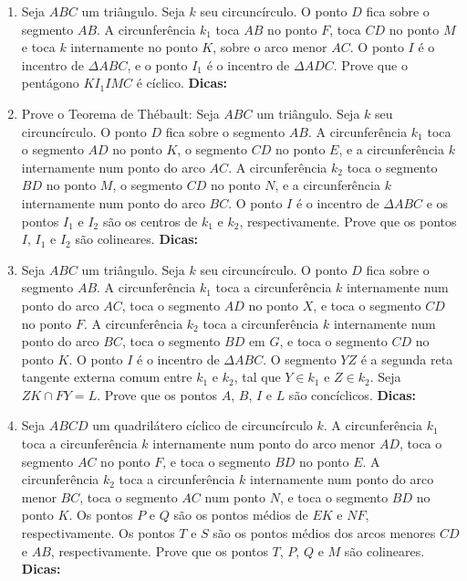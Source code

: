 \documentclass{article}
\newcommand{\dica}{\textbf{Dicas:}}
\newcommand{\iniTri}{Seja $ABC$ um triângulo}
\begin{document}
\begin{multicols}{2}
\begin{enumerate}
    \item \iniTri. Seja $k$ seu circuncírculo. O ponto $D$ fica sobre o segmento $AB$. A circunferência $k_1$ toca $AB$ no ponto $F$, toca $CD$ no ponto $M$ e toca $k$ internamente no ponto $K$, sobre o arco menor $AC$. O ponto $I$ é o incentro de $\Delta ABC$, e o ponto $I_1$ é o incentro de $\Delta ADC$. Prove que o pentágono $KI_1IMC$ é cíclico. \dica %
    
    \item Prove o Teorema de Thébault: \iniTri. Seja $k$ seu circuncírculo. O ponto $D$ fica sobre o segmento $AB$. A circunferência $k_1$ toca o segmento $AD$ no ponto $K$, o segmento $CD$ no ponto $E$, e a circunferência $k$ internamente num ponto do arco $AC$. A circunferência $k_2$ toca o segmento $BD$ no ponto $M$, o segmento $CD$ no ponto $N$, e a circunferência $k$ internamente num ponto do arco $BC$. O ponto $I$ é o incentro de $\Delta ABC$ e os pontos $I_1$ e $I_2$ são os centros de $k_1$ e $k_2$, respectivamente. Prove que os pontos $I$, $I_1$ e $I_2$ são colineares. \dica %
    
    \item \iniTri. Seja $k$ seu circuncírculo. O ponto $D$ fica sobre o segmento $AB$. A circunferência $k_1$ toca a circunferência $k$ internamente num ponto do arco $AC$, toca o segmento $AD$ no ponto $X$, e toca o segmento $CD$ no ponto $F$. A circunferência $k_2$ toca a circunferência $k$ internamente num ponto do arco $BC$, toca o segmento $BD$ em $G$, e toca o segmento $CD$ no ponto $K$. O ponto $I$ é o incentro de $\Delta ABC$. O segmento $YZ$ é a segunda reta tangente externa comum entre $k_1$ e $k_2$, tal que $Y\in k_1$ e $Z\in k_2$. Seja $ZK\cap FY=L$. Prove que os pontos $A$, $B$, $I$ e $L$ são concíclicos. \dica %
    
    \item Seja $ABCD$ um quadrilátero cíclico de circuncírculo $k$. A circunferência $k_1$ toca a circunferência $k$ internamente num ponto do arco menor $AD$, toca o segmento $AC$ no ponto $F$, e toca o segmento $BD$ no ponto $E$. A circunferência $k_2$ toca a circunferência $k$ internamente num ponto do arco menor $BC$, toca o segmento $AC$ num ponto $N$, e toca o segmento $BD$ no ponto $K$. Os pontos $P$ e $Q$ são os pontos médios de $EK$ e $NF$, respectivamente. Os pontos $T$ e $S$ são os pontos médios dos arcos menores $CD$ e $AB$, respectivamente. Prove que os pontos $T$, $P$, $Q$ e $M$ são colineares. \dica %
    

\end{enumerate}
\end{multicols}
\end{document}
